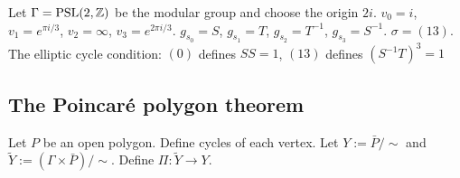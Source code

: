 \documentclass[a4paper]{article}
\begin{document}
\begin{prb}

\end{prb}

\begin{prb}
Let $\Gamma=\mathrm{PSL}(2,\mathbb{Z})$ be the modular group and choose the origin $2i$.
$v_0=i$, $v_1=e^{\pi i/3}$, $v_2=\infty$, $v_3=e^{2\pi i/3}$.
$g_{s_0}=S$, $g_{s_1}=T$, $g_{s_2}=T^{-1}$, $g_{s_3}=S^{-1}$.
$\sigma=(13)$.
The elliptic cycle condition: $(0)$ defines $SS=1$, $(13)$ defines $(S^{-1}T)^3=1$

\end{prb}






\subsection{The Poincar\'e polygon theorem}


\begin{prb}
\begin{parts}
\item
\end{parts}
\end{prb}

\begin{prb}
Let $P$ be an open polygon.
Define cycles of each vertex.
Let $Y:=\bar P/\sim$ and $\tilde Y:=(\Gamma\times\bar P)/\sim$.
Define $\Pi:\tilde Y\to Y$.
\begin{parts}
\item
\end{parts}
\end{prb}
\end{document}
